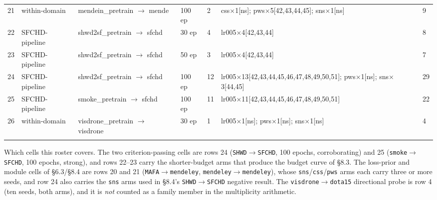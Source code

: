 \documentclass[pdflatex,sn-mathphys-ay]{sn-jnl}
\begin{document}
{\begin{longtable}{p{}p{}p{}p{}p{}p{}p{}}
21 & within-domain & mendein\_pretrain \ensuremath{\rightarrow} mende & 100 ep & 2 & css\ensuremath{\times}1[ns]; pws\ensuremath{\times}5[42,43,44,45]; sns\ensuremath{\times}1[ns] & 9 \\
22 & SFCHD-pipeline & shwd2sf\_pretrain \ensuremath{\rightarrow} sfchd & 30 ep & 4 & lr005\ensuremath{\times}4[42,43,44] & 8 \\
23 & SFCHD-pipeline & shwd2sf\_pretrain \ensuremath{\rightarrow} sfchd & 50 ep & 3 & lr005\ensuremath{\times}4[42,43,44] & 7 \\
24 & SFCHD-pipeline & shwd2sf\_pretrain \ensuremath{\rightarrow} sfchd & 100 ep & 12 & lr005\ensuremath{\times}13[42,43,44,45,46,47,48,49,50,51]; pws\ensuremath{\times}1[ns]; sns\ensuremath{\times}3[44,45] & 29 \\
25 & SFCHD-pipeline & smoke\_pretrain \ensuremath{\rightarrow} sfchd & 100 ep & 11 & lr005\ensuremath{\times}11[42,43,44,45,46,47,48,49,50,51] & 22 \\
26 & within-domain & visdrone\_pretrain \ensuremath{\rightarrow} visdrone & 30 ep & 1 & lr005\ensuremath{\times}1[ns]; pws\ensuremath{\times}1[ns]; sns\ensuremath{\times}1[ns] & 4 \\
\botrule
\end{longtable}}

Which cells this roster covers. The two criterion-passing cells are rows 24 (\texttt{SHWD\ensuremath{\rightarrow}SFCHD}, 100 epochs, corroborating) and 25 (\texttt{smoke\ensuremath{\rightarrow}SFCHD}, 100 epochs, strong), and rows 22--23 carry the shorter-budget arms that produce the budget curve of \S{}8.3. The loss-prior and module cells of \S{}6.3/\S{}8.4 are rows 20 and 21 (\texttt{MAFA\ensuremath{\rightarrow}mendeley}, \texttt{mendeley\ensuremath{\rightarrow}mendeley}), whose \texttt{sns}/\texttt{css}/\texttt{pws} arms each carry three or more seeds, and row 24 also carries the \texttt{sns} arms used in \S{}8.4's \texttt{SHWD\ensuremath{\rightarrow}SFCHD} negative result. The \texttt{visdrone\ensuremath{\rightarrow}dota15} directional probe is row 4 (ten seeds, both arms), and it is \emph{not} counted as a family member in the multiplicity arithmetic.
\end{document}
